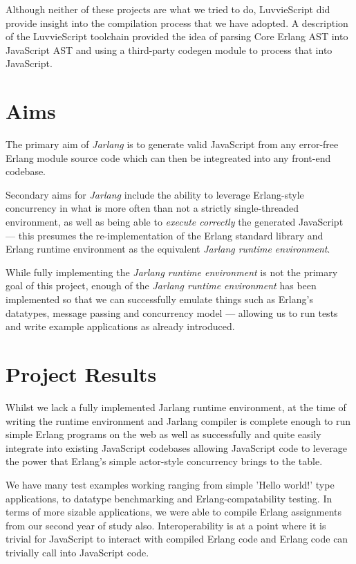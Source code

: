 \documentclass[twoside,12pt,titlepage,a4paper]{article}
\newcommand\blankpage{%
    \null
    \thispagestyle{empty}%
    \addtocounter{page}{-1}%
    \newpage}
\begin{document}
Although neither of these projects are what we tried to do, LuvvieScript did provide insight into the compilation process that we have adopted. A description of the LuvvieScript toolchain \citep{luvvieWebWayBack} provided the idea of parsing Core Erlang AST into JavaScript AST and using a third-party codegen module to process that into JavaScript.

\section{Aims}
\label{Aims}
The primary aim of \textit{Jarlang} is to generate valid JavaScript from any error-free Erlang module source code which can then be integreated into any front-end codebase.

Secondary aims for \textit{Jarlang} include the ability to leverage Erlang-style concurrency in what is more often than not a strictly single-threaded environment, as well as being able to \textit{execute correctly} the generated JavaScript --- this presumes the re-implementation of the Erlang standard library and Erlang runtime environment as the equivalent \textit{Jarlang runtime environment}.

While fully implementing the \textit{Jarlang runtime environment} is not the primary goal of this project, enough of the \textit{Jarlang runtime environment} has been implemented so that we can successfully emulate things such as Erlang's datatypes, message passing and concurrency model --- allowing us to run tests and write example applications as already introduced.


\blankpage
\section{Project Results}
\label{Results}
Whilst we lack a fully implemented Jarlang runtime environment, at the time of writing the runtime environment and Jarlang compiler is complete enough to run simple Erlang programs on the web as well as successfully and quite easily integrate into existing JavaScript codebases allowing JavaScript code to leverage the power that Erlang's simple actor-style concurrency brings to the table.

We have many test examples working ranging from simple 'Hello world!' type applications, to datatype benchmarking and Erlang-compatability testing. In terms of more sizable applications, we were able to compile Erlang assignments from our second year of study also. Interoperability is at a point where it is trivial for JavaScript to interact with compiled Erlang code and Erlang code can trivially call into JavaScript code.
\end{document}
